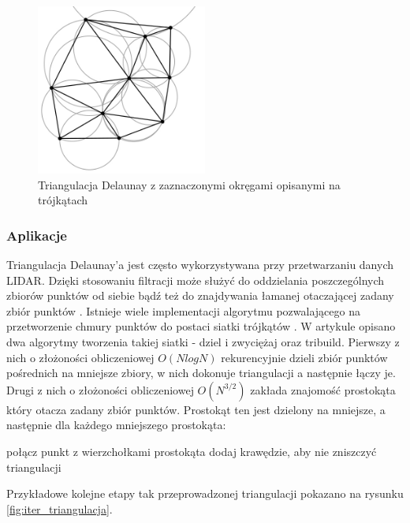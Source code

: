 \begin{figure}[h!]
    \centering
    \includegraphics[width=0.5\textwidth]{img/triangulacja.jpg}
    \caption{Triangulacja Delaunay z zaznaczonymi okręgami opisanymi na trójkątach}
    \label{fig:triangulacja}
\end{figure}

\subsubsection{Aplikacje}
Triangulacja Delaunay'a jest często wykorzystywana przy przetwarzaniu danych LIDAR. Dzięki stosowaniu filtracji może służyć do oddzielania poszczególnych zbiorów punktów od siebie \cite{koziol2007} bądź też do znajdywania łamanej otaczającej zadany zbiór punktów \cite{website:HumanGeoBlog}. Istnieje wiele implementacji algorytmu pozwalającego na przetworzenie chmury punktów do postaci siatki trójkątów \cite{Lee1980,Dwyer1987,jiang2010}. W artykule \cite{Lee1980} opisano dwa algorytmy tworzenia takiej siatki - dziel i zwyciężaj oraz tribuild. Pierwszy z nich o złożoności obliczeniowej $O(N log N)$ rekurencyjnie dzieli zbiór punktów pośrednich na mniejsze zbiory, w nich dokonuje triangulacji a następnie łączy je. Drugi z nich o złożoności obliczeniowej $O(N^{3/2})$ zakłada znajomość prostokąta który otacza zadany zbiór punktów. Prostokąt ten jest dzielony na mniejsze, a następnie dla każdego mniejszego prostokąta:

\begin{algorithmic}
        \State połącz punkt z wierzchołkami prostokąta
    \Else
        \State dodaj krawędzie, aby nie zniszczyć triangulacji
    \EndIf
    \EndFor
\end{algorithmic}

Przykładowe kolejne etapy tak przeprowadzonej triangulacji pokazano na rysunku \ref{fig:iter_triangulacja}.

